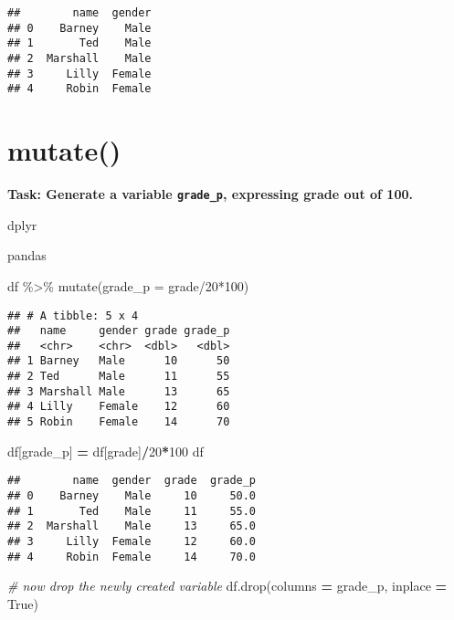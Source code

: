 \documentclass[
]{book}
\newenvironment{Shaded}{\begin{snugshade}}{\end{snugshade}}
\newcommand{\AttributeTok}[1]{\textcolor[rgb]{0.77,0.63,0.00}{#1}}
\newcommand{\CommentTok}[1]{\textcolor[rgb]{0.56,0.35,0.01}{\textit{#1}}}
\newcommand{\DecValTok}[1]{\textcolor[rgb]{0.00,0.00,0.81}{#1}}
\newcommand{\FunctionTok}[1]{\textcolor[rgb]{0.00,0.00,0.00}{#1}}
\newcommand{\NormalTok}[1]{#1}
\newcommand{\OperatorTok}[1]{\textcolor[rgb]{0.81,0.36,0.00}{\textbf{#1}}}
\newcommand{\SpecialCharTok}[1]{\textcolor[rgb]{0.00,0.00,0.00}{#1}}
\newcommand{\StringTok}[1]{\textcolor[rgb]{0.31,0.60,0.02}{#1}}
\newcommand{\VariableTok}[1]{\textcolor[rgb]{0.00,0.00,0.00}{#1}}
\begin{document}
\begin{verbatim}
##        name  gender
## 0    Barney    Male
## 1       Ted    Male
## 2  Marshall    Male
## 3     Lilly  Female
## 4     Robin  Female
\end{verbatim}

\hypertarget{mutate}{%
\section{mutate()}\label{mutate}}

{\textbf{Task: Generate a variable \texttt{grade\_p}, expressing grade out of 100.
}}

dplyr

pandas

\begin{Shaded}
\begin{Highlighting}[]
\NormalTok{df }\SpecialCharTok{\%\textgreater{}\%} 
  \FunctionTok{mutate}\NormalTok{(}\AttributeTok{grade\_p =}\NormalTok{ grade}\SpecialCharTok{/}\DecValTok{20}\SpecialCharTok{*}\DecValTok{100}\NormalTok{)}
\end{Highlighting}
\end{Shaded}

\begin{verbatim}
## # A tibble: 5 x 4
##   name     gender grade grade_p
##   <chr>    <chr>  <dbl>   <dbl>
## 1 Barney   Male      10      50
## 2 Ted      Male      11      55
## 3 Marshall Male      13      65
## 4 Lilly    Female    12      60
## 5 Robin    Female    14      70
\end{verbatim}

\begin{Shaded}
\begin{Highlighting}[]
\NormalTok{df[}\StringTok{\textquotesingle{}grade\_p\textquotesingle{}}\NormalTok{] }\OperatorTok{=}\NormalTok{ df[}\StringTok{\textquotesingle{}grade\textquotesingle{}}\NormalTok{]}\OperatorTok{/}\DecValTok{20}\OperatorTok{*}\DecValTok{100}
\NormalTok{df}
\end{Highlighting}
\end{Shaded}

\begin{verbatim}
##        name  gender  grade  grade_p
## 0    Barney    Male     10     50.0
## 1       Ted    Male     11     55.0
## 2  Marshall    Male     13     65.0
## 3     Lilly  Female     12     60.0
## 4     Robin  Female     14     70.0
\end{verbatim}

\begin{Shaded}
\begin{Highlighting}[]
\CommentTok{\# now drop the newly created variable}
\NormalTok{df.drop(columns }\OperatorTok{=} \StringTok{\textquotesingle{}grade\_p\textquotesingle{}}\NormalTok{, inplace }\OperatorTok{=} \VariableTok{True}\NormalTok{)}
\end{Highlighting}
\end{Shaded}
\end{document}
